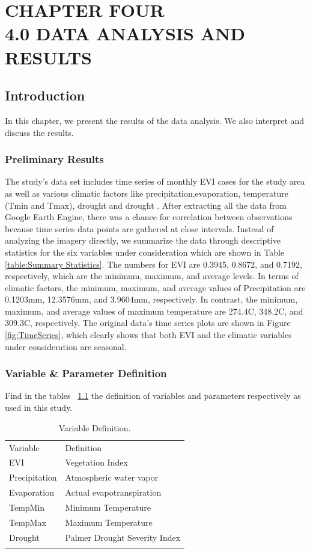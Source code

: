 
\chapter{CHAPTER FOUR\\4.0 DATA ANALYSIS AND RESULTS} %
\section{Introduction}
In this chapter, we present the results of the data analysis. We also interpret and discuss the results. 

\subsection{Preliminary Results}
The study's data set includes time series of monthly EVI cases for the study area as well as various climatic factors like precipitation,evaporation, temperature (Tmin and Tmax), drought and drought . After extracting all the data from  Google Earth Engine, there was a chance for correlation between observations because time series data points are gathered at close intervals. Instead of analyzing the imagery directly, we  summarize the data through descriptive statistics for the six variables under consideration which are shown in Table \ref{table:Summary Statistics}. The numbers for EVI are 0.3945, 0.8672, and 0.7192, respectively, which are the minimum, maximum, and average levels. In terms of climatic factors, the minimum, maximum, and average values of Precipitation are 0.1203mm, 12.3576mm, and 3.9604mm, respectively. In contrast, the minimum, maximum, and average values of maximum temperature are 274.4C, 348.2C, and 309.3C, respectively. The original data's time series plots are shown in Figure \ref{fig:TimeSeries}, which clearly shows that both EVI and the climatic variables under consideration are seasonal. 
\subsection{Variable \& Parameter Definition}
Find in the tables ~\ref{label:Variable}  the definition of variables and parameters respectively as used in this study. 
\begin{table}
	\label{label:Variable}
	\caption{Variable Definition.}
	\centering
	\begin{tabularx}{\textwidth}{ll}
		\hline\noalign{\smallskip}
		Variable & Definition \\ 
		\noalign{\smallskip}\hline\noalign{\smallskip}
	     EVI          & Vegetation Index\\  
		Precipitation & Atmospheric water vapor  \\ 
		Evaporation   & Actual evapotranspiration\\ 
		TempMin       & Minimum Temperature \\ 
		TempMax       & Maximum Temperature \\
		Drought       &Palmer Drought Severity Index\\
		\hline\noalign{\smallskip}
	\end{tabularx}
\end{table}
